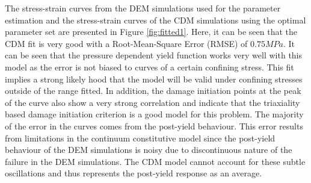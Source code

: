 The stress-strain curves from the DEM simulations used for the parameter estimation and the stress-strain curves of the CDM simulations using the optimal parameter set are presented in Figure \ref{fig:fitted1}. Here, it can be seen that the CDM fit is very good with a Root-Mean-Square Error (RMSE) of $0.75MPa$. It can be seen that the pressure dependent yield function works very well with this model as the error is not biased to curves of a certain confining stress. This fit implies a strong likely hood that the model will be valid under confining stresses outside of the range fitted. In addition, the damage initiation points at the peak of the curve also show a very strong correlation and indicate that the triaxiality based damage initiation criterion is a good model for this problem. The majority of the error in the curves comes from the post-yield behaviour. This error results from limitations in the continuum constitutive model since the post-yield behaviour of the DEM simulations is noisy due to discontinuous nature of the failure in the DEM simulations. The CDM model cannot account for these subtle oscillations and thus represents the post-yield response as an average. 
